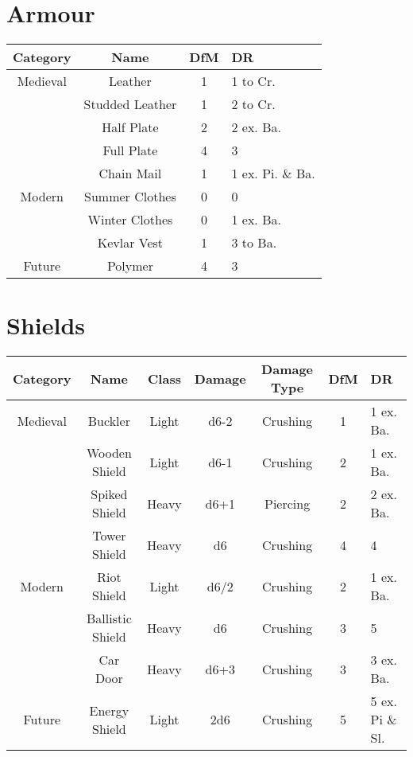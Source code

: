 \section{Armour} \label{sec:armour}
\begin{center}
\begin{tabular}{c|c|c|l}
\textbf{Category} & \textbf{Name}  & \textbf{DfM} & \textbf{DR}\\\hline
         Medieval & Leather        & 1 & 1 to Cr.\\
                  & Studded Leather& 1 & 2 to Cr.\\
                  & Half Plate     & 2 & 2 ex. Ba.\\
                  & Full Plate     & 4 & 3 \\
                  & Chain Mail     & 1 & 1 ex. Pi. \& Ba.\\\hline
           Modern & Summer Clothes & 0 & 0 \\
                  & Winter Clothes & 0 & 1 ex. Ba.\\
                  & Kevlar Vest    & 1 & 3 to Ba.\\\hline
           Future & Polymer        & 4 & 3 \\
\end{tabular}
\end{center}

\section{Shields} \label{sec:shields}
\begin{center}
    \begin{tabular}{c|c|c|c|c|c|l}
        \textbf{Category} & \textbf{Name} & \textbf{Class} & \textbf{Damage} & \textbf{Damage Type} & \textbf{DfM} & \textbf{DR} \\\hline
        Medieval & Buckler          & Light & d6-2 & Crushing & 1 & 1 ex. Ba.\\
                 & Wooden Shield    & Light & d6-1 & Crushing & 2 & 1 ex. Ba.\\
                 & Spiked Shield    & Heavy & d6+1 & Piercing & 2 & 2 ex. Ba.\\
                 & Tower Shield     & Heavy & d6   & Crushing & 4 & 4\\\hline
        Modern   & Riot Shield      & Light & d6/2 & Crushing & 2 & 1 ex. Ba.\\
                 & Ballistic Shield & Heavy & d6   & Crushing & 3 & 5\\
                 & Car Door         & Heavy & d6+3 & Crushing & 3 & 3 ex. Ba.\\\hline
        Future   & Energy Shield    & Light & 2d6  & Crushing & 5 & 5 ex. Pi \& Sl.
    \end{tabular}
\end{center}

